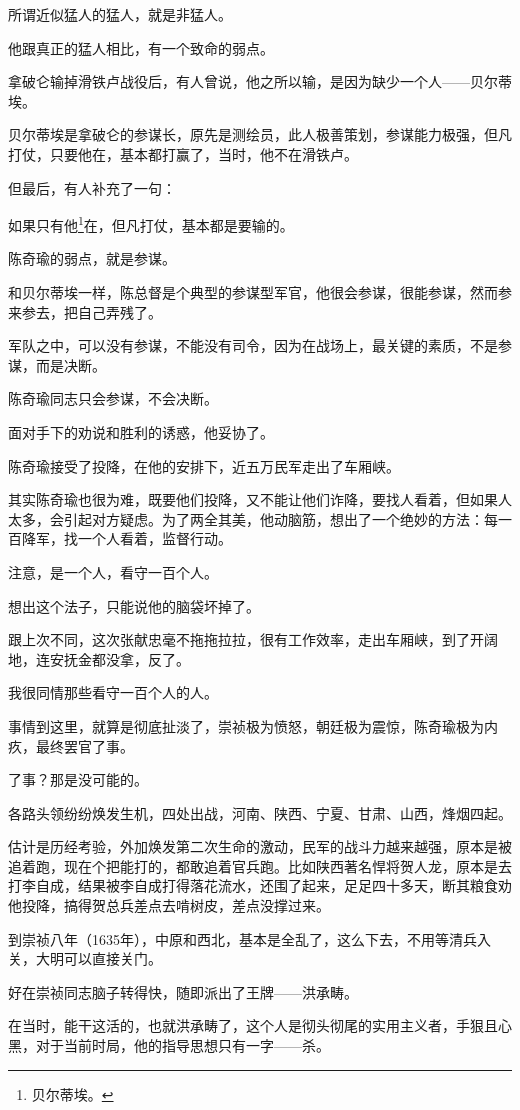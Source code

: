 \begin{multicols}{\theparacolNo}
所谓近似猛人的猛人，就是非猛人。

他跟真正的猛人相比，有一个致命的弱点。

拿破仑输掉滑铁卢战役后，有人曾说，他之所以输，是因为缺少一个人——贝尔蒂埃。

贝尔蒂埃是拿破仑的参谋长，原先是测绘员，此人极善策划，参谋能力极强，但凡打仗，只要他在，基本都打赢了，当时，他不在滑铁卢。

但最后，有人补充了一句：

如果只有他\footnote{贝尔蒂埃。}在，但凡打仗，基本都是要输的。

陈奇瑜的弱点，就是参谋。

和贝尔蒂埃一样，陈总督是个典型的参谋型军官，他很会参谋，很能参谋，然而参来参去，把自己弄残了。

军队之中，可以没有参谋，不能没有司令，因为在战场上，最关键的素质，不是参谋，而是决断。

陈奇瑜同志只会参谋，不会决断。

面对手下的劝说和胜利的诱惑，他妥协了。

陈奇瑜接受了投降，在他的安排下，近五万民军走出了车厢峡。

其实陈奇瑜也很为难，既要他们投降，又不能让他们诈降，要找人看着，但如果人太多，会引起对方疑虑。为了两全其美，他动脑筋，想出了一个绝妙的方法：每一百降军，找一个人看着，监督行动。

注意，是一个人，看守一百个人。

想出这个法子，只能说他的脑袋坏掉了。

跟上次不同，这次张献忠毫不拖拖拉拉，很有工作效率，走出车厢峡，到了开阔地，连安抚金都没拿，反了。

我很同情那些看守一百个人的人。

事情到这里，就算是彻底扯淡了，崇祯极为愤怒，朝廷极为震惊，陈奇瑜极为内疚，最终罢官了事。

了事？那是没可能的。

各路头领纷纷焕发生机，四处出战，河南、陕西、宁夏、甘肃、山西，烽烟四起。

估计是历经考验，外加焕发第二次生命的激动，民军的战斗力越来越强，原本是被追着跑，现在个把能打的，都敢追着官兵跑。比如陕西著名悍将贺人龙，原本是去打李自成，结果被李自成打得落花流水，还围了起来，足足四十多天，断其粮食劝他投降，搞得贺总兵差点去啃树皮，差点没撑过来。

到崇祯八年（1635年），中原和西北，基本是全乱了，这么下去，不用等清兵入关，大明可以直接关门。

好在崇祯同志脑子转得快，随即派出了王牌——洪承畴。

在当时，能干这活的，也就洪承畴了，这个人是彻头彻尾的实用主义者，手狠且心黑，对于当前时局，他的指导思想只有一字——杀。


\end{multicols}
